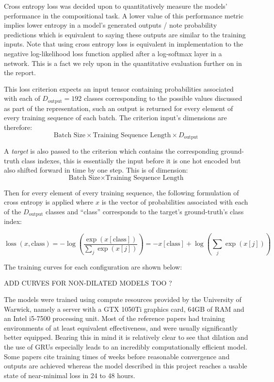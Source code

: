 \documentclass[12pt,]{article}
\begin{document}
Cross entropy loss was decided upon to quantitatively measure the
models' performance in the compositional task. A lower value of this
performance metric implies lower entropy in a model's generated outputs
/ note probability predictions which is equivalent to saying these
outputs are similar to the training inputs. Note that using cross
entropy loss is equivalent in implementation to the negative
log-likelihood loss function applied after a log-softmax layer in a
network. This is a fact we rely upon in the quantitative evaluation
further on in the report.

This loss criterion expects an input tensor containing probabilities
associated with each of \(D_{\text{output}} = 192\) classes
corresponding to the possible values discussed as part of the
representation, such an output is returned for every element of every
training sequence of each batch. The criterion input's dimensions are
therefore:
\[\text{Batch Size} \times \text{Training Sequence Length} \times D_{\text{output}}\]

A \emph{target} is also passed to the criterion which contains the
corresponding ground-truth class indexes, this is essentially the input
before it is one hot encoded but also shifted forward in time by one
step. This is of dimension:
\[\text{Batch Size} \times \text{Training Sequence Length}\]

Then for every element of every training sequence, the following
formulation of cross entropy is applied where \(x\) is the vector of
probabilities associated with each of the \(D_{\text{output}}\) classes
and ``class'' corresponds to the target's ground-truth's class index:

\[
\operatorname{loss}(x, \text {class})=-\log \left(\frac{\exp (x[\text{class}])}{\sum_{j} \exp (x[j])}\right)=-x[\text {class}]+\log \left(\sum_{j} \exp (x[j])\right)
\]

The training curves for each configuration are shown below:

ADD CURVES FOR NON-DILATED MODELS TOO ?

The models were trained using compute resources provided by the
University of Warwick, namely a server with a GTX 1050Ti graphics card,
64GB of RAM and an Intel i5-7500 processing unit. Most of the reference
papers had training environments of at least equivalent effectiveness,
and were usually significantly better equipped. Bearing this in mind it
is relatively clear to see that dilation and the use of GRUs especially
leads to an incredibly computationally efficient model. Some papers cite
training times of weeks before reasonable convergence and outputs are
achieved whereas the model described in this project reaches a usable
state of near-minimal loss in 24 to 48 hours.
\end{document}
